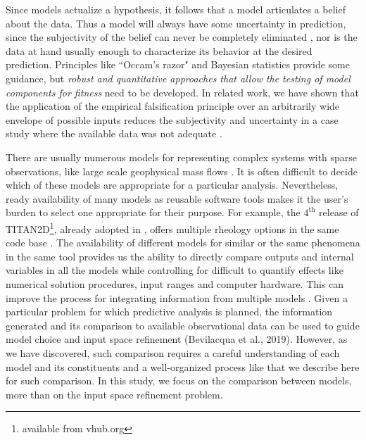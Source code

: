 \documentclass{article}
\begin{document}
Since models actualize a hypothesis, it follows  that a model articulates a belief about the data. Thus a model will always have some uncertainty in prediction, since the {subjectivity of the belief} can never be completely eliminated \citep{Kennedy2001, Higdon2004}, nor is  the data at hand  usually enough to characterize its behavior at the desired prediction. Principles like ``Occam's razor" and Bayesian statistics \citep{Farrell2015} provide some guidance, but {\it  robust and quantitative approaches that allow the  testing of model components for fitness }need to be developed. In related work, we have shown that the  application of the empirical falsification principle \citep{Popper1959} over an arbitrarily wide envelope of possible inputs reduces the subjectivity and uncertainty in a case study where the available data was not adequate \citep{Bevilacqua2019}.%

There are usually numerous models for representing complex systems with sparse observations, like large scale geophysical mass flows \cite{Kelfoun2011}. It is often difficult to decide which of these models are appropriate for a particular analysis. Nevertheless, ready availability of many models as reusable software tools makes it the user's burden to select one appropriate for their purpose.
For example, the $\mathrm{4^{\mathrm{th}}}$ release of TITAN2D\footnote{available from vhub.org}, already adopted in \citep{Bevilacqua2019}, offers multiple rheology options in the same code base \citep{Simakov2019}. The availability of different models for similar or the same phenomena in the same tool provides us the ability to directly compare outputs and internal variables in all the models while controlling for difficult to quantify effects like numerical solution procedures, input ranges and computer hardware. This can improve the process for integrating information from multiple models \citep{Bongard2007}. Given a particular problem for which predictive analysis is planned, the information generated and its comparison to available observational data can be used to guide model choice and input space refinement (Bevilacqua et al., 2019). However, as we have discovered, such comparison requires a careful understanding of each model and its constituents and a well-organized process like that we describe here for such comparison. In this study, we focus on the comparison between models, more than on the input space refinement problem. %
\end{document}
